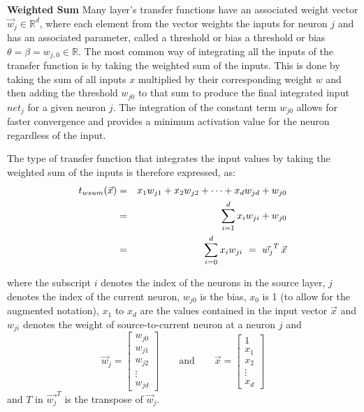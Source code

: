 
\textbf{Weighted Sum}
\label{sec:weightedsum}
Many layer's transfer functions have an associated weight vector $\vec{w}_j\in \mathbb{R}^d$, where each element from the vector weights the inputs for neuron $j$ and has an associated parameter, called a threshold or bias a threshold or bias $\theta= \beta= w_{j,0}\in \mathbb{R}$. The most common way of integrating all the inputs of the transfer function is by taking the weighted sum of the inputs. This is done by taking the sum of all inputs $x$ multiplied by their corresponding weight $w$ and then adding the threshold $w_{j 0}$ to that sum to produce the final integrated input $net_j$ for a given neuron $j$. The integration of the constant term $w_{j 0}$ allows for faster convergence and provides a minimum activation value for the neuron regardless of the input. 

The type of transfer function that integrates the input values by taking the weighted sum of the inputs is therefore expressed, as:
\begin{eqnarray}
    \notag t_{wsum}(\vec{x}) & = & x_{1} w_{j 1}+x_{2} w_{j 2}+\cdots+x_{d} w_{j d}+w_{j 0} \\
    \notag & = & \sum_{i=1}^{d} x_{i} w_{j i}+w_{j 0} \\
     & = & \sum_{i=0}^{d} x_{i} w_{j i} \ = \  \vec{{w}_j}^T\, \vec{x}
    \label{eq:weightredsum}
\end{eqnarray}

where the subscript $i$ denotes the index of the neurons in the source layer, $j$ denotes the index of the current neuron, $w_{j0}$ is the bias, $x_0$ is 1 (to allow for the augmented notation), $x_1$ to $x_d$ are the values contained in the input vector $\vec{x}$ and $w_{ji}$ denotes the weight of source-to-current neuron at a neuron $j$ and 
\begin{equation*}
  \vec{w}_{j}=\left[\begin{matrix}w_{j 0}\\ w_{j 1} \\ w_{j 2} \\ \vdots  \\ w_{j d }\end{matrix}\right] 
  \qquad \mbox{and}\qquad
  \vec{x}=\left[\begin{matrix} 1\\ x_{1} \\ x_{2} \\ \vdots \\ x_{d} \end{matrix}\right]
\end{equation*}
and ${T}$ in $\vec{{w}_j}^T$ is the transpose of $\vec{w}_{j}$.



